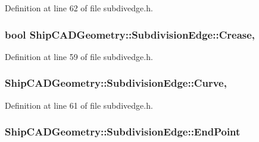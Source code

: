 Definition at line 62 of file subdivedge.\-h.

\hypertarget{classShipCADGeometry_1_1SubdivisionEdge_ab36f0260a63d4ca62c45feddf96f8505}{
\subsubsection[{Crease}]{\setlength{\rightskip}{0pt plus 5cm}bool Ship\-C\-A\-D\-Geometry\-::\-Subdivision\-Edge\-::\-Crease\hspace{0.3cm}{\ttfamily [read]}, {\ttfamily [write]}}}\label{classShipCADGeometry_1_1SubdivisionEdge_ab36f0260a63d4ca62c45feddf96f8505}


Definition at line 59 of file subdivedge.\-h.

\hypertarget{classShipCADGeometry_1_1SubdivisionEdge_abdc110088d3e486395a31dd7c7328dd4}{
\subsubsection[{Curve}]{ Ship\-C\-A\-D\-Geometry\-::\-Subdivision\-Edge\-::\-Curve\hspace{0.3cm}{\ttfamily [read]}, {\ttfamily [write]}}}\label{classShipCADGeometry_1_1SubdivisionEdge_abdc110088d3e486395a31dd7c7328dd4}


Definition at line 61 of file subdivedge.\-h.

\hypertarget{classShipCADGeometry_1_1SubdivisionEdge_aaec4f19ba8274a3b501a06fedb0658cb}{
\subsubsection[{End\-Point}]{ Ship\-C\-A\-D\-Geometry\-::\-Subdivision\-Edge\-::\-End\-Point\hspace{0.3cm}{\ttfamily [read]}}}\label{classShipCADGeometry_1_1SubdivisionEdge_aaec4f19ba8274a3b501a06fedb0658cb}


